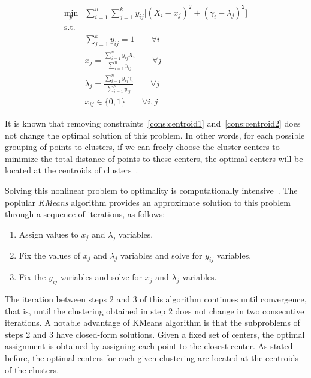 \documentclass{scrartcl}
\begin{document}
\begin{multicols*}{2}
\begin{align}
\min_{\mathbf{y}} & \sum_{i=1}^{n} \sum_{j=1}^{k} y_{ij} \big[ (\bar{X_i} - x_j)^2 + (\gamma_i - \lambda_j)^2 \big] \nonumber \\
\text{s.t.} & \nonumber \\
& \sum_{j=1}^k y_{ij} = 1 \qquad \forall i \\
& x_j = \frac{\sum_{i=1}^{n} y_{ij} \bar{X_i}}{\sum_{i=1}^{n} y_{ij}}  \qquad \forall j \label{cons:centroid1}\\
& \lambda_j = \frac{\sum_{i=1}^{n} y_{ij} \gamma_i}{\sum_{i=1}^{n} y_{ij}} \qquad \forall j \label{cons:centroid2}\\
& x_{ij} \in \{0, 1\} \qquad \forall i, j \nonumber
\end{align}

It is known that removing constraints~\ref{cons:centroid1} and~\ref{cons:centroid2} does not change the optimal solution of this problem. In other words, for each possible grouping of points to clusters, if we can freely choose the cluster centers to minimize the total distance of points to these centers, the optimal centers will be located at the centroids of clusters~\cite{AloiseHL12}.  

Solving this nonlinear problem to optimality is computationally intensive~\cite{AloiseDHP09}. The poplular \emph{KMeans} algorithm provides an approximate solution to this problem through a sequence of iterations, as follows: 

\begin{enumerate}
\item Assign values to $x_j$ and $\lambda_j$ variables. 
\item Fix the values of $x_j$ and $\lambda_j$ variables and solve  for $y_{ij}$ variables.
\item Fix the $y_{ij}$ variables and solve for $x_j$ and $\lambda_j$ variables.
\end{enumerate}

The iteration between steps 2 and 3 of this algorithm continues until convergence, that is, until the clustering obtained in step 2 does not change in two consecutive iterations. A notable advantage of KMeans algorithm is that the subproblems of steps 2 and 3 have closed-form solutions. Given a fixed set of centers, the optimal assignment is obtained by assigning each point to the closest center. As stated before, the optimal centers for each given clustering are located at the centroids of the clusters. 


\end{multicols*}
\end{document}
